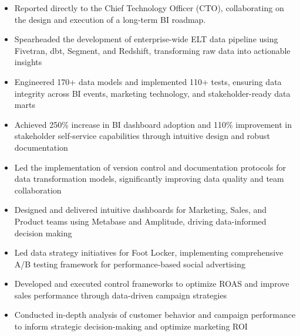 \documentclass[10pt,a4paper,ragged2e,withhyper]{altacv}
\begin{document}
\begin{paracol}{2}
\divider
\smallskip
{}
\begin{itemize}
\item Reported directly to the Chief Technology Officer (CTO), collaborating on the design and execution of a long-term BI roadmap.
\item Spearheaded the development of enterprise-wide ELT data pipeline using Fivetran, dbt, Segment, and Redshift, transforming raw data into actionable insights
\item Engineered 170+ data models and implemented 110+ tests, ensuring data integrity across BI events, marketing technology, and stakeholder-ready data marts
\item Achieved 250\% increase in BI dashboard adoption and 110\% improvement in stakeholder self-service capabilities through intuitive design and robust documentation
\item Led the implementation of version control and documentation protocols for data transformation models, significantly improving data quality and team collaboration
\item Designed and delivered intuitive dashboards for Marketing, Sales, and Product teams using Metabase and Amplitude, driving data-informed decision making
\end{itemize}


\begin{itemize}
\item Led data strategy initiatives for Foot Locker, implementing comprehensive A/B testing framework for performance-based social advertising
\item Developed and executed control frameworks to optimize ROAS and improve sales performance through data-driven campaign strategies
\item Conducted in-depth analysis of customer behavior and campaign performance to inform strategic decision-making and optimize marketing ROI
\end{itemize}

\divider


\end{paracol}
\end{document}
